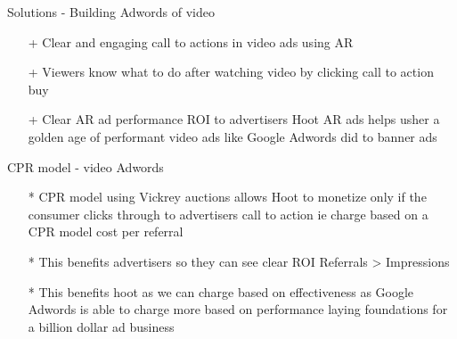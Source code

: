 \documentclass[10pt]{beamer}
\begin{document}
\begin{frame}[fragile]{Solutions - Building Adwords of video}
\begin{itemize}
\item[+]Clear and engaging call to actions in video ads using AR
\pause
\item[+]Viewers know what to do after watching video by clicking call to action buy 
\pause
\item[+]Clear AR ad performance ROI to advertisers 
\pause
Hoot AR ads helps usher a golden age of performant video ads like Google Adwords did to banner ads
\end{itemize}


\end{frame}
\begin{frame}[t]{CPR model - video Adwords}
\begin{itemize}
\item[*]CPR model using Vickrey auctions allows Hoot to monetize only if the consumer clicks through to advertisers call to action ie charge based on a CPR model cost per referral
\pause
\item[*]This benefits advertisers so they can see clear ROI Referrals > Impressions
\pause
\item[*]This benefits hoot as we can charge based on effectiveness as Google Adwords is able to charge more based on performance laying foundations for a billion dollar ad business
\end{itemize}
\end{frame}
\end{document}
